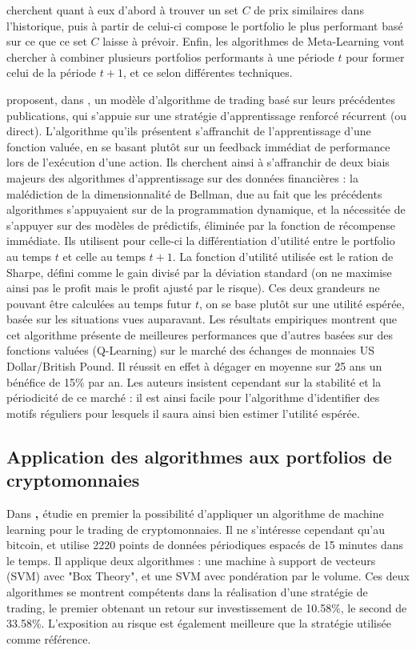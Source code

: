 \documentclass[a4paper]{article}
\begin{document}
cherchent quant à eux d'abord à trouver un set $C$ de prix similaires dans l'historique, puis à partir de celui-ci compose le portfolio le plus performant basé sur ce que ce set $C$ laisse à prévoir. Enfin, les algorithmes de Meta-Learning vont chercher à combiner plusieurs portfolios performants à une période $t$ pour former celui de la période $t+1$, et ce selon différentes techniques.

\textbf{\citet{Moody2001}} proposent, dans \textbf{}, un modèle d'algorithme de trading basé sur leurs précédentes publications, qui s'appuie sur une stratégie d'apprentissage renforcé récurrent (ou direct). L'algorithme qu'ils présentent s'affranchit de l'apprentissage d'une fonction valuée, en se basant plutôt sur un feedback immédiat de performance lors de l'exécution d'une action. Ils cherchent ainsi à s'affranchir de deux biais majeurs des algorithmes d'apprentissage sur des données financières : la malédiction de la dimensionnalité de Bellman, due au fait que les précédents algorithmes s'appuyaient sur de la programmation dynamique, et la nécessitée de s'appuyer sur des modèles de prédictifs, éliminée par la fonction de récompense immédiate. Ils utilisent pour celle-ci la différentiation d'utilité entre le portfolio au temps $t$ et celle au temps $t+1$. La fonction d'utilité utilisée est le ration de Sharpe, défini comme le gain divisé par la déviation standard (on ne maximise ainsi pas le profit mais le profit ajusté par le risque). Ces deux grandeurs ne pouvant être calculées au temps futur $t$, on se base plutôt sur une utilité espérée, basée sur les situations vues auparavant. Les résultats empiriques montrent que cet algorithme présente de meilleures performances que d'autres basées sur des fonctions valuées (Q-Learning) sur le marché des échanges de monnaies US Dollar/British Pound. Il réussit en effet à dégager en moyenne sur 25 ans un bénéfice de 15\% par an. Les auteurs insistent cependant sur la stabilité et la périodicité de ce marché : il est ainsi facile pour l'algorithme d'identifier des motifs réguliers pour lesquels il saura ainsi bien estimer l'utilité espérée.

\subsection{Application des algorithmes aux portfolios de cryptomonnaies}

Dans \textbf{, \citet{Zbikowski2016}} étudie en premier la possibilité d'appliquer un algorithme de machine learning pour le trading de cryptomonnaies. Il ne s'intéresse cependant qu'au bitcoin, et utilise 2220 points de données périodiques espacés de 15 minutes dans le temps. Il applique deux algorithmes : une machine à support de vecteurs (SVM) avec "Box Theory", et une SVM avec pondération par le volume. Ces deux algorithmes se montrent compétents dans la réalisation d'une stratégie de trading, le premier obtenant un retour sur investissement de 10.58\%, le second de 33.58\%. L'exposition au risque est également meilleure que la stratégie utilisée comme référence.
\end{document}
